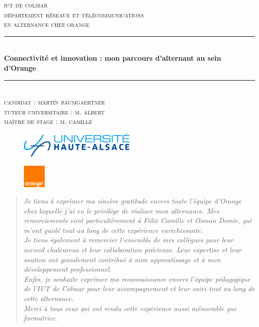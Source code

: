 \documentclass[12pt, a4paper]{article}
\newenvironment*{remerciements}{%
\renewcommand*{\abstractname}{Remerciements}
\begin{abstract}
}{\end{abstract}}
\begin{document}
\begin{titlepage}
	\newcommand{\HRule}{\rule{\linewidth}{0.5mm}} 
	\center 
	\textsc{\LARGE iut de colmar}\\[6.5cm] 
	
	\textsc{\Large département réseaux et télécommunications}\\[0.5cm] 
	\textsc{\large en alternance chez orange}\\[0.5cm]
	\HRule\\[0.75cm]
	{\Large\bfseries Connectivité et innovation : mon parcours d'alternant au sein d'Orange}\\[0.4cm]
	\HRule\\[0.5cm]
	\textsc{\large candidat : martin baumgaertner\\
	tuteur universitaire : m. albert\\
	maître de stage : m. camille }\\[5cm] 
	\begin{figure}[h]
		\centering
		\includegraphics[width=0.5\textwidth]{img/uha.png}
	\end{figure}
	\begin{figure}[h]
		\centering
		\includegraphics[width=0.1\textwidth]{img/orange.png}
	\end{figure}

	\vfill\vfill\vfill
	\vfill
\end{titlepage}
\newpage
\pagestyle{empty}
\begin{remerciements}
	\textit{Je tiens à exprimer ma sincère gratitude envers toute l'équipe d'Orange chez 
	laquelle j'ai eu le privilège de réaliser mon alternance. Mes remerciements
	vont particulièrement à Félix Camille et Osman Demir, qui m'ont guidé tout
	au long de cette expérience enrichissante.}\\

	\textit{Je tiens également à remercier l'ensemble de mes collègues pour leur accueil
	chaleureux et leur collaboration précieuse. Leur expertise et leur soutien ont
	grandement contribué à mon apprentissage et à mon développement professionnel.}\\

	\textit{Enfin, je souhaite exprimer ma reconnaissance envers l'équipe pédagogique de
	l'IUT de Colmar pour leur accompagnement et leur suivi tout au
	long de cette alternance.}\\

	\textit{Merci à tous ceux qui ont rendu cette expérience aussi mémorable que formatrice.}
	
\end{remerciements}
\newpage
\doparttoc
\tableofcontents
\newpage
\listoffigures
\newpage
\end{document}

